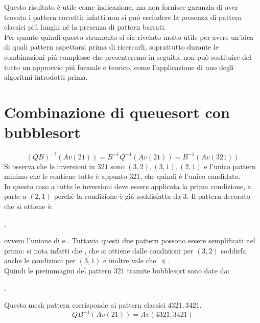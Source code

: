 Questo risultato \`e utile come indicazione, ma non fornisce garanzia di aver trovato i pattern corretti: infatti non si pu\`o escludere la presenza di pattern classici pi\'u lunghi n\'e la presenza di pattern barrati.\\
Per quanto quindi questo strumento si sia rivelato molto utile per avere un'idea di quali pattern aspettarsi prima di ricercarli, soprattutto durante le combinazioni pi\'u complesse che presenteremo in seguito, non pu\`o sostituire del tutto un approccio pi\'u formale e teorico, come l'applicazione di uno degli algoritmi introdotti prima.
\section*{Combinazione di queuesort con bubblesort}
$$(QB)^{-1}(Av(21))=B^{-1}Q^{-1}(Av(21))=B^{-1}(Av(321))$$
Si osserva che le inversioni in $321$ sono $(3,2),(3,1),(2,1)$ e l'unico pattern minimo che le contiene tutte \`e appunto $321$, che quindi \`e l'unico candidato.\\
In questo caso a tutte le inversioni deve essere applicata la prima condizione, a parte a $(2,1)$ perch\'e la condizione \`e gi\`a soddisfatta da 3. Il pattern decorato che si ottiene \`e:
\begin{center}
,
\end{center}
ovvero  l'unione di  e . Tuttavia questi due pattern possono essere semplificati nel primo: si nota infatti che , che si ottiene dalle condizioni per $(3,2)$ soddisfa anche le condizioni per $(3,1)$ e inoltre vale che $\preceq$.\\
Quindi le preimmagini del pattern 321 tramite bubblesort sono date da:
\begin{center}
.
\end{center}
Questo mesh pattern corrisponde ai pattern classici $4321,3421$.$$QB^{-1}(Av(21))=Av(4321,3421)$$
